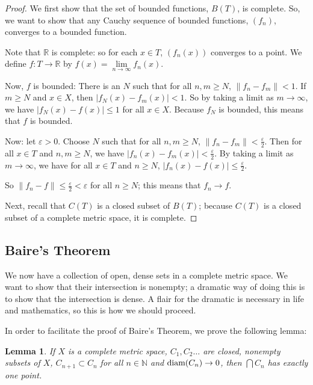 \documentclass{amsart}
\newcommand{\vep}{\varepsilon}
\newcommand{\N}{\mathbb{N}}
\newcommand{\R}{\mathbb{R}}
\newcommand{\diam}{\text{\rm diam}}
\newcommand{\absval}[1]{\left| #1 \right|}
\newcommand{\norm}[1]{\|#1\|}
\newtheorem{lem}[thm]{Lemma}
\theoremstyle{definition}
\begin{document}
\begin{proof}
We first show that the set of bounded functions, $B(T)$, is complete.
So, we want to show that any Cauchy sequence of bounded functions, $(f_n)$, converges to a bounded function.

Note that $\R$ is complete: so for each $x \in T$, $(f_n(x))$ converges to a point. We define $f: T \to \R$ by $f(x) = \lim\limits_{n \to \infty} f_n(x)$.

Now, $f$ is bounded: 
There is an $N$ such that for all $n,m \geq N$, $\norm{f_n-f_m} < 1$.
If $m \geq N$ and $x \in X$, then $\absval{f_N(x) - f_m(x)} < 1$.
So by taking a limit as $m \to \infty$, we have $\absval{f_N(x) - f(x)} \leq 1$ for all $x \in X$.
Because $f_N$ is bounded, this means that $f$ is bounded.

Now: let $\vep >0$. Choose $N$ such that for all $n,m \geq N$, $\norm{f_n-f_m} < \frac{\vep}{2}$. 
Then for all $x \in T$ and $n,m \geq N$, we have $\absval{f_n(x) - f_m(x)} < \frac{\vep}{2}$.
By taking a limit as $m \to \infty$, we have for all $x \in T$ and $n \geq N$, $\absval{f_n(x) - f(x)} \leq \frac{\vep}{2}$.

So $\norm{f_n - f} \leq \frac{\vep}{2} < \vep$ for all $n \geq N$; this means that $f_n \to f$.

Next, recall that $C(T)$ is a closed subset of $B(T)$; because $C(T)$ is a closed subset of a complete metric space, it is complete.

\end{proof}

\subsection{Baire's Theorem} \hspace*{\fill}

We now have a collection of open, dense sets in a complete metric space. 
We want to show that their intersection is nonempty; a dramatic way of doing this is to show that the intersection is dense. 
A flair for the dramatic is necessary in life and mathematics, so this is how we should proceed.

In order to facilitate the proof of Baire's Theorem, we prove the following lemma:

\begin{lem}
If $X$ is a complete metric space, $C_1, C_2 \ldots$ are closed, nonempty subsets of $X$, $C_{n+1} \subset C_n$ for all $n \in \N$ and $\diam(C_n) \to 0$, then $\bigcap C_n$ has exactly one point.
\end{lem}
\end{document}
